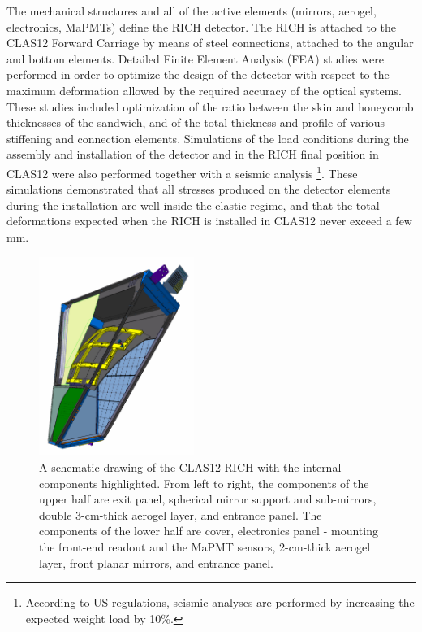 \documentclass[5p,times,twocolumn]{elsarticle}
\def\MaPMT{MaPMT }
\begin{document}
The mechanical structures and all of the active elements (mirrors, aerogel, electronics, MaPMTs) define the RICH
detector. The RICH is attached to the CLAS12 Forward Carriage by means of steel connections, attached to the
angular and bottom elements. Detailed Finite Element Analysis (FEA) studies were performed in order to optimize
the design of the detector with respect to the maximum deformation allowed by the required accuracy of the optical
systems. These studies included optimization of the ratio between the skin and honeycomb thicknesses of the sandwich,
and of the total thickness and profile of various stiffening and connection elements. Simulations of the load conditions
during the assembly and installation of the detector and in the RICH final position in CLAS12 were also performed
together with a seismic analysis \footnote{According to US regulations, seismic analyses are performed by increasing
the expected weight load by 10\%.}. These simulations demonstrated that all stresses produced on the detector
elements during the installation are well inside the elastic regime, and that the total deformations expected when the
RICH is installed in CLAS12 never exceed a few mm.

\begin{figure}
\begin{center}
\includegraphics[width=0.45\textwidth]{RICH.pdf}
\caption{A schematic drawing of the CLAS12 RICH with the internal components highlighted. From left to right, the 
components of the upper half are exit panel, spherical mirror support and sub-mirrors, double 3-cm-thick aerogel
layer, and entrance panel. The components of the lower half are cover, electronics panel - mounting the front-end readout
and the \MaPMT sensors, 2-cm-thick aerogel layer, front planar mirrors, and entrance panel.}
\label{Fig:RICHexplo}
\end{center}
\end{figure}
\end{document}
